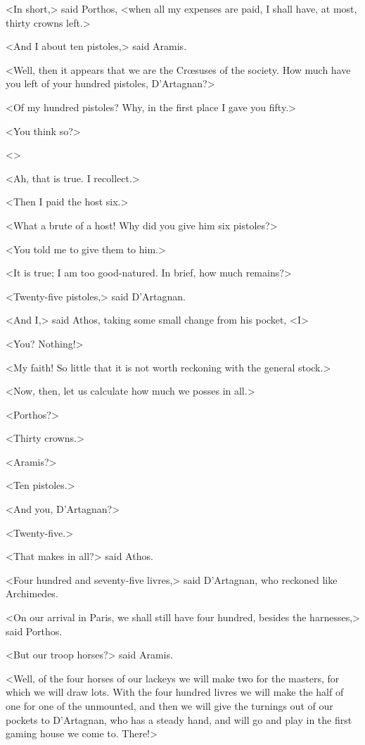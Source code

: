 <In short,> said Porthos, <when all my expenses are paid, I shall have, at most, thirty crowns left.> 

<And I about ten pistoles,> said Aramis. 

<Well, then it appears that we are the Crœsuses of the society. How much have you left of your hundred pistoles, D'Artagnan?> 

<Of my hundred pistoles? Why, in the first place I gave you fifty.> 

<You think so?> 

<> 

<Ah, that is true. I recollect.> 

<Then I paid the host six.> 

<What a brute of a host! Why did you give him six pistoles?> 

<You told me to give them to him.> 

<It is true; I am too good-natured. In brief, how much remains?> 

<Twenty-five pistoles,> said D'Artagnan. 

<And I,> said Athos, taking some small change from his pocket, <I\longdash> 

<You? Nothing!> 

<My faith! So little that it is not worth reckoning with the general stock.> 

<Now, then, let us calculate how much we posses in all.> 

<Porthos?> 

<Thirty crowns.> 

<Aramis?> 

<Ten pistoles.> 

<And you, D'Artagnan?> 

<Twenty-five.> 

<That makes in all?> said Athos. 

<Four hundred and seventy-five livres,> said D'Artagnan, who reckoned like Archimedes. 

<On our arrival in Paris, we shall still have four hundred, besides the harnesses,> said Porthos. 

<But our troop horses?> said Aramis. 

<Well, of the four horses of our lackeys we will make two for the masters, for which we will draw lots. With the four hundred livres we will make the half of one for one of the unmounted, and then we will give the turnings out of our pockets to D'Artagnan, who has a steady hand, and will go and play in the first gaming house we come to. There!> 

